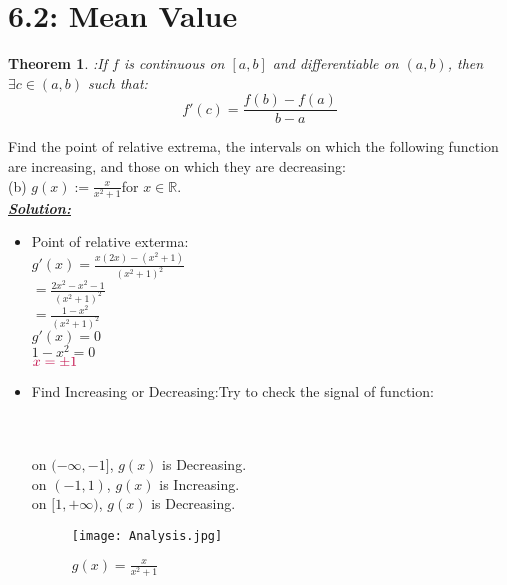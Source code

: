 \documentclass[12pt]{article}
\newtheorem{theorem}{Theorem}
\begin{document}
\section*{6.2: Mean Value}
\begin{theorem}
:If $f$ is continuous on $[a,b]$ and differentiable on $(a,b)$, then $\exists c \in (a,b)$ such that: 
$${f}'(c) =\frac{f(b)-f(a)}{b-a}$$ 
\end{theorem}
Find the point of relative extrema, the intervals on which the following function are increasing, and those on which they are decreasing:\\
   (b) $g(x):=\frac{x}{x^2+1}$\hspace{.5cm}for $x\in\mathbb{R}$.\\
 \textbf{\underline{\textit{\color{purple}Solution:}}}
 \begin{itemize}
     \item Point of relative exterma:
     \\${g}'(x)=\frac{x(2x)-(x^2+1)}{(x^2+1)^2}$
     \\$=\frac{2x^2-x^2-1}{(x^2+1)^2}$
     \\$=\frac{1-x^2}{(x^2+1)^2}$
     \\${g}'(x)=0$
     \\$1-x^2=0$
     \\$\color{purple}x=\pm 1$
     \item Find Increasing or Decreasing:Try to check the signal of function:\\
     \\
\\
on $(-\infty,-1]$, $g(x)$ is {\color{purple}Decreasing}.\\
on $(-1,1)$, $g(x)$ is {\color{purple}Increasing}.\\
on $[1,+\infty)$, $g(x)$ is {\color{purple}Decreasing}.\\
\begin{figure}
\centering
    \texttt{[image: Analysis.jpg]}
    \caption{$g(x)=\frac{x}{x^2+1}$}
\end{figure}

\end{itemize}
\end{document}
